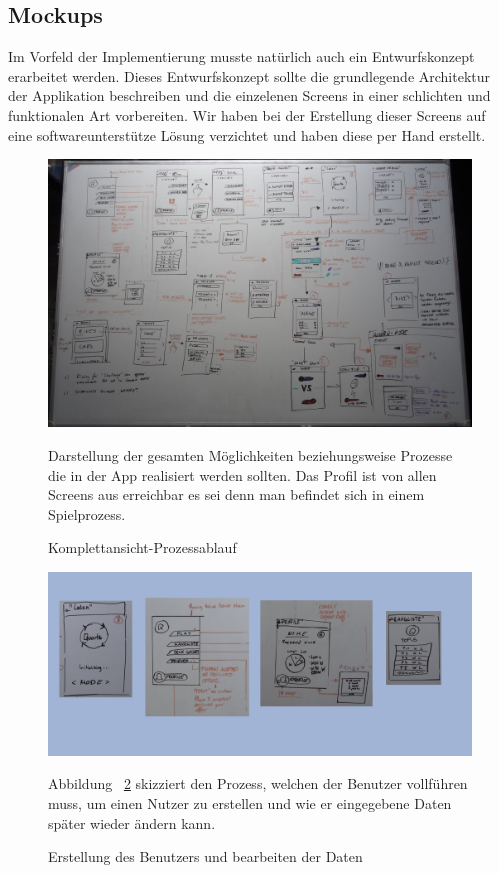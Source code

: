 \documentclass{scrartcl}
\begin{document}
\subsection{Mockups}
Im Vorfeld der Implementierung musste natürlich auch ein Entwurfskonzept erarbeitet werden. Dieses Entwurfskonzept sollte die grundlegende Architektur der Applikation beschreiben und die einzelenen Screens in einer schlichten und funktionalen Art vorbereiten.
Wir haben bei der Erstellung dieser Screens auf eine softwareunterstütze Lösung verzichtet und haben diese per Hand erstellt.
\begin{figure}[!ht]
\begin{center}
	\includegraphics[scale=0.5]{pics/overview.png}
	\caption{Komplettansicht-Prozessablauf}
	\label{overview}
\end{center}
Darstellung der gesamten Möglichkeiten beziehungsweise Prozesse die in der App realisiert werden sollten. 
Das Profil ist von allen Screens aus erreichbar es sei denn man befindet sich in einem Spielprozess.
\end{figure}

\begin{figure}[!ht]
\begin{center}
	\includegraphics[scale=0.4]{pics/userhandling.png}
	\caption{Erstellung des Benutzers und bearbeiten der Daten}
	\label{UserProfil}
\end{center}
Abbildung ~\ref{UserProfil} skizziert den Prozess, welchen der Benutzer
vollführen muss, um einen Nutzer zu erstellen und wie er eingegebene Daten später wieder ändern kann.
\end{figure}
\end{document}
